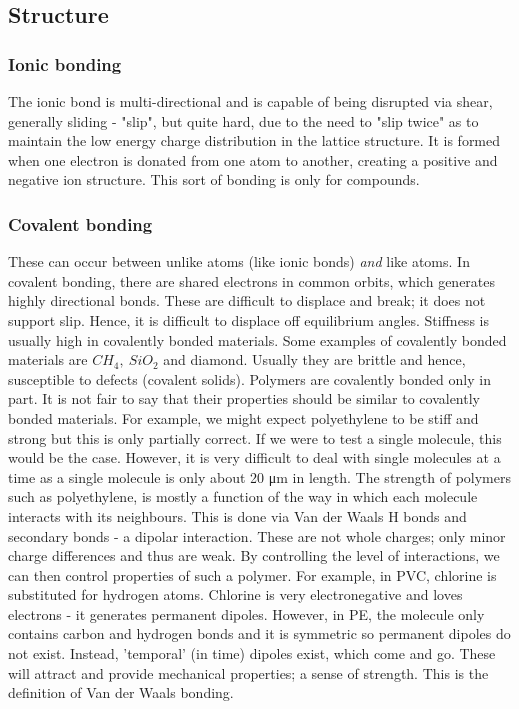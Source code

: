 \documentclass[class=report, crop=false, 12pt,a4paper]{standalone}
\begin{document}
\subsection{Structure}
\subsubsection{Ionic bonding}
The ionic bond is multi-directional and is capable of being disrupted via shear, generally sliding - "slip", but quite hard, due to the need to "slip twice" as to maintain the low energy charge distribution in the lattice structure. It is formed when one electron is donated from one atom to another, creating a positive and negative ion structure. This sort of bonding is only for compounds.
\subsubsection{Covalent bonding}
These can occur between unlike atoms (like ionic bonds) \emph{and} like atoms. In covalent bonding, there are shared electrons in common orbits, which generates highly directional bonds. These are difficult to displace and break; it does not support slip. Hence, it is difficult to displace off equilibrium angles. Stiffness is usually high in covalently bonded materials. Some examples of covalently bonded materials are \( CH_4, \ SiO_2 \) and diamond. Usually they are brittle and hence, susceptible to defects (covalent solids). Polymers are covalently bonded only in part. It is not fair to say that their properties should be similar to covalently bonded materials. For example, we might expect polyethylene to be stiff and strong but this is only partially correct. If we were to test a single molecule, this would be the case. However, it is very difficult to deal with single molecules at a time as a single molecule is only about 20 \si{\micro\meter} in length. The strength of polymers such as polyethylene, is mostly a function of the way in which each molecule interacts with its neighbours. This is done via Van der Waals H bonds and secondary bonds - a dipolar interaction. These are not whole charges; only minor charge differences and thus are weak. By controlling the level of interactions, we can then control properties of such a polymer. For example, in PVC, chlorine is substituted for hydrogen atoms. Chlorine is very electronegative and loves electrons - it generates permanent dipoles. However, in PE, the molecule only contains carbon and hydrogen bonds and it is symmetric so permanent dipoles do not exist. Instead, 'temporal' (in time) dipoles exist, which come and go. These will attract and provide mechanical properties; a sense of strength. This is the definition of Van der Waals bonding. 
\end{document}
